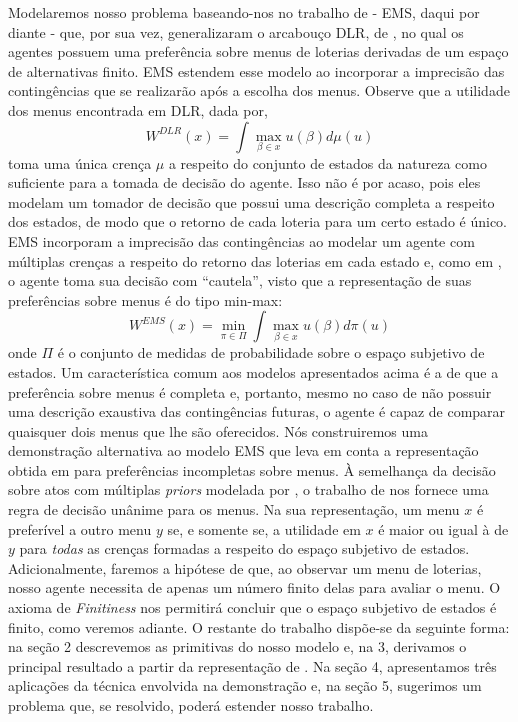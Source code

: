 \documentclass[11pt, a4paper]{article}
\theoremstyle{nonumberplain}
\theoremstyle{plain}
\theoremstyle{plain}
\theoremstyle{plain}
\theoremstyle{nonumberplain}
\begin{document}
Modelaremos nosso problema baseando-nos no trabalho de \cite{Epstein2007} - EMS, daqui por diante - que, por sua vez, generalizaram o arcabouço DLR, de \cite{Dekel2001}, no qual os agentes possuem uma preferência sobre menus de loterias derivadas de um espaço de alternativas finito. EMS estendem esse modelo ao incorporar a imprecisão das contingências que se realizarão após a escolha dos menus.
Observe que a utilidade dos menus encontrada em DLR, dada por,
$$ W^{DLR}(x)=\int \max_{\beta\in x}u(\beta)d\mu(u) $$
toma uma única crença $\mu$ a respeito do conjunto de estados da natureza como suficiente para a tomada de decisão do agente. Isso não é por acaso, pois eles modelam um tomador de decisão que possui uma descrição completa a respeito dos estados, de modo que o retorno de cada loteria para um certo estado é único. EMS incorporam a imprecisão das contingências ao modelar um agente com múltiplas crenças a respeito do retorno das loterias em cada estado e, como em \cite{Gilboa1989}, o agente toma sua decisão com ``cautela'', visto que a representação de suas preferências sobre menus é do tipo min-max: $$W^{EMS}(x)=\min_{\pi\in\Pi} \int \max_{\beta\in x}u(\beta)d\pi(u)$$ onde $\Pi$ é o conjunto de medidas de probabilidade sobre o espaço subjetivo de estados.
Um característica comum aos modelos apresentados acima é a de que a preferência sobre menus é completa e, portanto, mesmo no caso de não possuir uma descrição exaustiva das contingências futuras, o agente é capaz de comparar quaisquer dois menus que lhe são oferecidos. Nós construiremos uma demonstração alternativa ao modelo EMS que leva em conta a representação obtida em \cite{Kochov2007} para preferências incompletas sobre menus. À semelhança da decisão sobre atos com múltiplas \emph{priors} modelada por \cite{Gilboa2010}, o trabalho de \cite{Kochov2007} nos fornece uma regra de decisão unânime para os menus. Na sua representação, um menu $x$ é preferível a outro menu $y$ se, e somente se, a utilidade em $x$ é maior ou igual à de $y$ para \emph{todas} as crenças formadas a respeito do espaço subjetivo de estados. Adicionalmente, faremos a hipótese de que, ao observar um menu de loterias, nosso agente necessita de apenas um número finito delas para avaliar o menu. O axioma de \emph{Finitiness} nos permitirá concluir que o espaço subjetivo de estados é finito, como veremos adiante.
O restante do trabalho dispõe-se da seguinte forma: na seção 2 descrevemos as primitivas do nosso modelo e, na 3, derivamos o principal resultado a partir da representação de \cite{Kochov2007}. Na seção 4, apresentamos três aplicações da técnica envolvida na demonstração e, na seção 5, sugerimos um problema que, se resolvido, poderá estender nosso trabalho.
\end{document}
